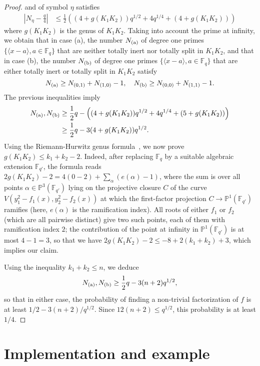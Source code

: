 \documentclass[12pt]{article}
\theoremstyle{plain}
\theoremstyle{definition}
\def\F{\ensuremath{\mathbb{F}}}
\def\P{\ensuremath{\mathbb{P}}}
\begin{document}
\begin{proof}
  and of symbol $\eta$ satisfies
  \begin{align*}
  \left|N_\eta  - \frac{q}{4} \right| & \le  \frac 12 \left ( (4+g(K_1K_2)) q^{1/2} + 4 q^{1/4}  + (4 + g(K_1K_2)) \right)  
  \end{align*}
  where $g(K_1K_2)$ is the genus of $K_1K_2$. Taking into account the
  prime at infinity, we obtain that in case (a), the number $N_{\rm (a)}$ of degree one
  primes $\{\langle x-a\rangle, a \in \F_q\}$ that are neither totally
  inert nor totally split in $K_1K_2$, and that in case (b), the number $N_{\rm (b)}$ of degree
  one primes $\{\langle x-a\rangle, a \in \F_q\}$ that are either
  totally inert or totally split in $K_1K_2$ satisfy
  $$ N_{\rm (a)} \ge N_{(0,1)} + N_{(1,0)} -1, \quad N_{\rm (b)} \ge N_{(0,0)} + N_{(1,1)} -1.$$
  The previous inequalities imply
  \begin{align*}
N_{\rm (a)}, N_{\rm (b)} & \ge \frac 12 q - \left ( (4+g(K_1K_2)) q^{1/2} + 4 q^{1/4}  + (5 + g(K_1K_2)) \right)  \\
&\ge \frac 12 q - 3(4+g(K_1K_2)) q^{1/2}.
  \end{align*}
  Using the Riemann-Hurwitz genus
  formula~\cite[Theorem~7.16]{Rosen02}, we now prove $g(K_1K_2) \le
  k_1 + k_2 -2$. Indeed, after replacing $\F_q$ by a suitable
  algebraic extension $\F_{q'}$, the formula reads $2 g(K_1 K_2)-2 =
  4(0-2) + \sum_\alpha (e(\alpha)-1)$, where the sum is over all
  points $\alpha \in \P^3(\F_{q'})$ lying on the projective closure
  $C$ of the curve $V(y_1^2-f_1(x),y_2^2-f_2(x))$ at which the
  first-factor projection $C \to \P^1(\F_{q'})$ ramifies (here,
  $e(\alpha)$ is the ramification index). All roots of either $f_1$ or
  $f_2$ (which are all pairwise distinct) give two such points, each
  of them with ramification index $2$; the contribution of the point
  at infinity in $\P^1(\F_{q'})$ is at most $4-1=3$, so that we have
  $2 g(K_1 K_2)-2 \le -8 + 2(k_1 + k_2) + 3$, which implies our claim.

  Using the inequality $k_1 + k_2 \le n$, we deduce
  $$N_{\rm (a)}, N_{\rm (b)} \ge \frac 12 q - 3(n+2) q^{1/2},$$ 
  so that in either case, the probability of finding a non-trivial factorization
  of $f$ is at least $1/2- 3(n+2)/q^{1/2}$.
  Since $12(n+2)  \le q^{1/2}$, this probability is at least $1/4$.
\end{proof}


\section{Implementation and example}
\label{sec:impl}
\end{document}
